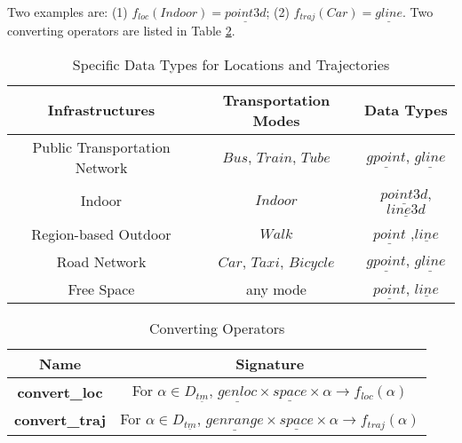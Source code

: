 Two examples are: (1) $f_{loc}(Indoor)=\underline{point3d}$; (2) $f_{traj}(Car)= \underline{gline}$. Two converting operators are listed in Table \ref{tab:convertoperators}.  

\begin{table}[ht]
 \begin{center} 
  \begin{tabular}{c|c|c}
    \hline
    \textbf{Infrastructures}& \textbf{Transportation Modes} & \textbf{Data Types} \\
    \hline
    Public Transportation Network&$Bus$, $Train$, $Tube$& $\underline{gpoint}$, $\underline{gline}$ \\
    \hline
    Indoor &$Indoor$ & $\underline{point3d}$, $\underline{line3d}$ \\
    \hline
    Region-based Outdoor&$Walk$ & $\underline{point}$ ,$\underline{line}$ \\
    \hline
    Road Network &$Car$, $Taxi$, $Bicycle$ & $\underline{gpoint}$, $\underline{gline}$ \\
    \hline
    Free Space&any mode & $\underline{point}$, $\underline{line}$\\
    \hline
  \end{tabular}
 \end{center}
 \caption{\label{tab:specificdatatyps}Specific Data Types for Locations and Trajectories}
\end{table}


\begin{table}[ht]
 \begin{center} 
  \begin{tabular}{c|c}
    \hline
    \textbf{Name} & \textbf{Signature} \\
    \hline 
    \textbf{convert\_loc}& For $\alpha \in D_{\underline{tm}}$, $\underline{genloc} \times \underline{space} \times \alpha \rightarrow f_{loc}(\alpha)$\\
    \hline 
    \textbf{convert\_traj}& For $\alpha \in D_{\underline{tm}}$, $\underline{genrange} \times \underline{space} \times \alpha \rightarrow f_{traj}(\alpha)$\\
    \hline 
  \end{tabular}
 \end{center}
 \caption{\label{tab:convertoperators} Converting Operators}
\end{table}


